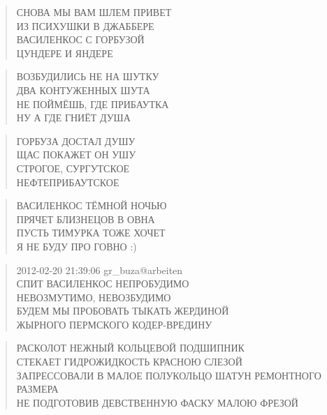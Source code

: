 \poemtitle{***}
\begin{verse}
СНОВА МЫ ВАМ ШЛЕМ ПРИВЕТ\\
ИЗ ПСИХУШКИ В ДЖАББЕРЕ\\
ВАСИЛЕНКОС С ГОРБУЗОЙ\\
ЦУНДЕРЕ И ЯНДЕРЕ
\end{verse}

\poemtitle{***}
\begin{verse}
ВОЗБУДИЛИСЬ НЕ НА ШУТКУ\\
ДВА КОНТУЖЕННЫХ ШУТА\\
НЕ ПОЙМЁШЬ, ГДЕ ПРИБАУТКА\\
НУ А ГДЕ ГНИЁТ ДУША
\end{verse}

\poemtitle{***}
\begin{verse}
ГОРБУЗА ДОСТАЛ ДУШУ\\
ЩАС ПОКАЖЕТ ОН УШУ\\
СТРОГОЕ, СУРГУТСКОЕ\\
НЕФТЕПРИБАУТСКОЕ
\end{verse}

\poemtitle{***}
\begin{verse}
ВАСИЛЕНКОС ТЁМНОЙ НОЧЬЮ\\
ПРЯЧЕТ БЛИЗНЕЦОВ В ОВНА\\
ПУСТЬ ТИМУРКА ТОЖЕ ХОЧЕТ\\
Я НЕ БУДУ ПРО ГОВНО :)
\end{verse}

\poemtitle{***}
\begin{verse}
2012-02-20 21:39:06 gr\_buza@arbeiten\\
СПИТ ВАСИЛЕНКОС НЕПРОБУДИМО\\
НЕВОЗМУТИМО, НЕВОЗБУДИМО\\
БУДЕМ МЫ ПРОБОВАТЬ ТЫКАТЬ ЖЕРДИНОЙ\\
ЖЫРНОГО ПЕРМСКОГО КОДЕР-ВРЕДИНУ
\end{verse}

\poemtitle{***}
\begin{verse}
РАСКОЛОТ НЕЖНЫЙ КОЛЬЦЕВОЙ ПОДШИПНИК\\
СТЕКАЕТ ГИДРОЖИДКОСТЬ КРАСНОЮ СЛЕЗОЙ\\
ЗАПРЕССОВАЛИ В МАЛОЕ ПОЛУКОЛЬЦО ШАТУН РЕМОНТНОГО РАЗМЕРА\\
НЕ ПОДГОТОВИВ ДЕВСТВЕННУЮ ФАСКУ МАЛОЮ ФРЕЗОЙ
\end{verse}

